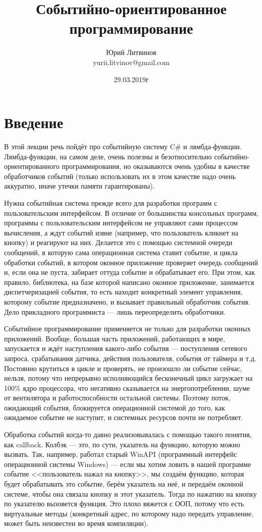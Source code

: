 \documentclass[a5paper]{article}
\title{Событийно-ориентированное программирование}
\author{Юрий Литвинов\\\small{yurii.litvinov@gmail.com}}
\date{29.03.2019г}
\begin{document}
\maketitle
\thispagestyle{empty}

\section{Введение}

В этой лекции речь пойдёт про событийную систему C\# и лямбда-функции. Лямбда-функции, на самом деле, очень полезны и безотносительно событийно-ориентированного программирования, но оказываются очень удобны в качестве обработчиков событий (только использовать их в этом качестве надо очень аккуратно, иначе утечки памяти гарантированы). 

Нужна событийная система прежде всего для разработки программ с пользовательским интерфейсом. В отличие от большинства консольных программ, программы с пользовательским интерфейсом не управляют сами процессом вычисления, а ждут событий извне (например, что пользователь кликнет на кнопку) и реагируют на них. Делается это с помощью системной очереди сообщений, в которую сама операционная система ставит событие, и цикла обработки событий, в котором оконное приложение проверяет очередь сообщений и, если она не пуста, забирает оттуда событие  и обрабатывает его. При этом, как правило, библиотека, на базе которой написано оконное приложение, занимается диспетчеризацией события, то есть находит конкретный элемент управления, которому событие предназначено, и вызывает правильный обработчик события. Дело прикладного программиста --- лишь переопределить обработчики.

Событийное программирование применяется не только для разработки оконных приложений. Вообще, большая часть приложений, работающих в мире, запускается и ждёт наступления какого-либо события --- поступления сетевого запроса, срабатывания датчика, действия пользователя, события от таймера и т.д. Постоянно крутиться в цикле и проверять, не произошло ли событие сейчас, нельзя, потому что непрерывно исполняющийся бесконечный цикл загружает на 100\% ядро процессора, что негативно сказывается на энергопотреблении, шуме от вентилятора и работоспособности остальной системы. Поэтому поток, ожидающий события, блокируется операционной системой до того, как ожидаемое событие не наступит, и системных ресурсов почти не потребляет.

Обработка событий когда-то давно реализовывалась с помощью такого понятия, как callback. Колбэк --- это, по сути, указатель на функцию, которую можно вызвать. Так, например, работал старый WinAPI (программный интерфейс операционной системы Windows) --- если мы хотим ловить в нашей программе событие <<пользователь нажал на кнопку>>, мы создаём функцию, которая будет обрабатывать это событие, берём указатель на неё, и передаём оконной системе, чтобы она связала кнопку и этот указатель. Тогда по нажатию на кнопку по указателю вызовется функция. Это плохо вяжется с ООП, потому что есть виртуальные методы (конкретный адрес, по которому надо передать управление, может быть неизвестен во время компиляции).
\end{document}
